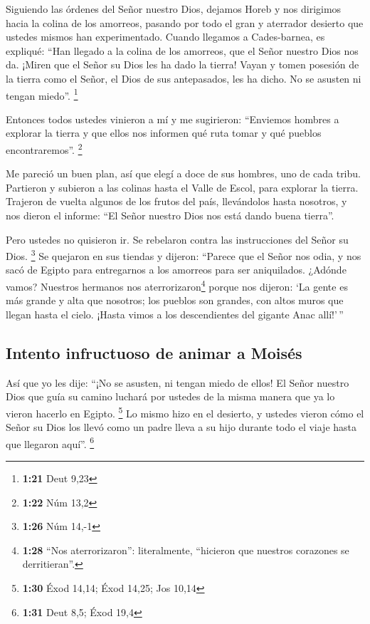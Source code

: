  Siguiendo las órdenes del Señor nuestro Dios, dejamos
Horeb y nos dirigimos hacia la colina de los amorreos, pasando por todo
el gran y aterrador desierto que ustedes mismos han experimentado.
Cuando llegamos a Cades-barnea,  es expliqué: ``Han
llegado a la colina de los amorreos, que el Señor nuestro Dios nos da.
 ¡Miren que el Señor su Dios les ha dado la tierra! Vayan
y tomen posesión de la tierra como el Señor, el Dios de sus antepasados,
les ha dicho. No se asusten ni tengan miedo''. \footnote{\textbf{1:21}
  Deut 9,23}

 Entonces todos ustedes vinieron a mí y me sugirieron:
``Enviemos hombres a explorar la tierra y que ellos nos informen qué
ruta tomar y qué pueblos encontraremos''. \footnote{\textbf{1:22} Núm
  13,2}

 Me pareció un buen plan, así que elegí a doce de sus
hombres, uno de cada tribu.  Partieron y subieron a las
colinas hasta el Valle de Escol, para explorar la tierra.
 Trajeron de vuelta algunos de los frutos del país,
llevándolos hasta nosotros, y nos dieron el informe: ``El Señor nuestro
Dios nos está dando buena tierra''.

 Pero ustedes no quisieron ir. Se rebelaron contra las
instrucciones del Señor su Dios. \footnote{\textbf{1:26} Núm 14,-1}
 Se quejaron en sus tiendas y dijeron: ``Parece que el
Señor nos odia, y nos sacó de Egipto para entregarnos a los amorreos
para ser aniquilados.  ¿Adónde vamos? Nuestros hermanos
nos aterrorizaron\footnote{\textbf{1:28} ``Nos aterrorizaron'':
  literalmente, ``hicieron que nuestros corazones se derritieran''.}
porque nos dijeron: `La gente es más grande y alta que nosotros; los
pueblos son grandes, con altos muros que llegan hasta el cielo. ¡Hasta
vimos a los descendientes del gigante Anac allí!'\,''

\hypertarget{intento-infructuoso-de-animar-a-moisuxe9s}{%
\subsection{Intento infructuoso de animar a
Moisés}\label{intento-infructuoso-de-animar-a-moisuxe9s}}

 Así que yo les dije: ``¡No se asusten, ni tengan miedo
de ellos!  El Señor nuestro Dios que guía su camino
luchará por ustedes de la misma manera que ya lo vieron hacerlo en
Egipto. \footnote{\textbf{1:30} Éxod 14,14; Éxod 14,25; Jos 10,14}
 Lo mismo hizo en el desierto, y ustedes vieron cómo el
Señor su Dios los llevó como un padre lleva a su hijo durante todo el
viaje hasta que llegaron aquí''. \footnote{\textbf{1:31} Deut 8,5; Éxod
  19,4}


